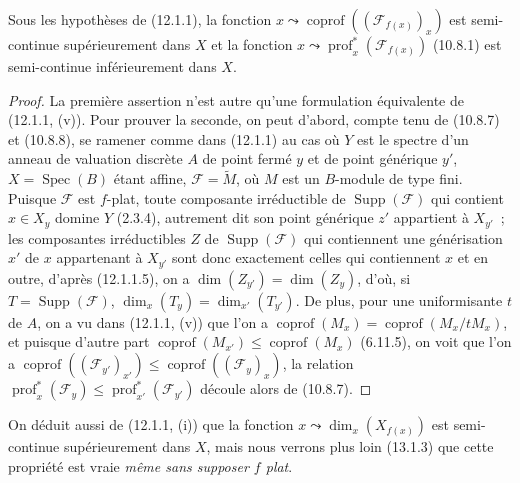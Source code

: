\begin{corollary}[12.1.3]
\label{IV.12.1.3-fr}
Sous les hypothèses de \textup{(12.1.1)}, la fonction
$x\leadsto\operatorname{coprof}((\mathcal F_{f(x)})_x)$ est semi-continue
supérieurement dans $X$ et la fonction
$x\leadsto\operatorname{prof}_x^*(\mathcal F_{f(x)})$ \textup{(10.8.1)} est
semi-continue inférieurement dans $X$.
\end{corollary}

\begin{proof}
La première assertion n'est autre qu'une formulation équivalente de (12.1.1,
(v)). Pour prouver la seconde, on peut d'abord, compte tenu de (10.8.7) et
(10.8.8), se ramener comme dans (12.1.1) au cas où $Y$ est le spectre d'un
anneau de valuation discrète $A$ de point fermé $y$ et de point générique $y'$,
$X=\operatorname{Spec}(B)$ étant affine, $\mathcal F=\widetilde M$, où $M$ est
un $B$-module de type fini. Puisque $\mathcal F$ est $f$-plat, toute composante
irréductible de $\operatorname{Supp}(\mathcal F)$ qui contient $x\in X_y$
domine $Y$ (2.3.4), autrement dit son point générique $z'$ appartient à
$X_{y'}$~; les composantes irréductibles $Z$ de
$\operatorname{Supp}(\mathcal F)$ qui contiennent une générisation $x'$ de
$x$ appartenant à $X_{y'}$ sont donc exactement celles qui contiennent $x$ et
en outre, d'après (12.1.1.5), on a $\dim(Z_{y'})=\dim(Z_y)$, d'où, si
$T=\operatorname{Supp}(\mathcal F)$,
$\dim_x(T_y)=\dim_{x'}(T_{y'})$. De plus, pour une uniformisante $t$ de $A$, on
a vu dans (12.1.1, (v)) que l'on a
$\operatorname{coprof}(M_x)=\operatorname{coprof}(M_x/tM_x)$, et puisque
d'autre part $\operatorname{coprof}(M_{x'})\leq\operatorname{coprof}(M_x)$
(6.11.5), on voit que l'on a
$\operatorname{coprof}((\mathcal F_{y'})_{x'})\leq
\operatorname{coprof}((\mathcal F_y)_x)$, la relation
$\operatorname{prof}_x^*(\mathcal F_y)\leq
\operatorname{prof}_{x'}^*(\mathcal F_{y'})$ découle alors de (10.8.7).
\end{proof}

\begin{remark}[12.1.4]
\label{IV.12.1.4-fr}
On déduit aussi de (12.1.1, (i)) que la fonction
$x\leadsto\dim_x(X_{f(x)})$ est semi-continue supérieurement dans $X$, mais
nous verrons plus loin (13.1.3) que cette propriété est vraie \emph{même sans
supposer $f$ plat}.
\end{remark}

